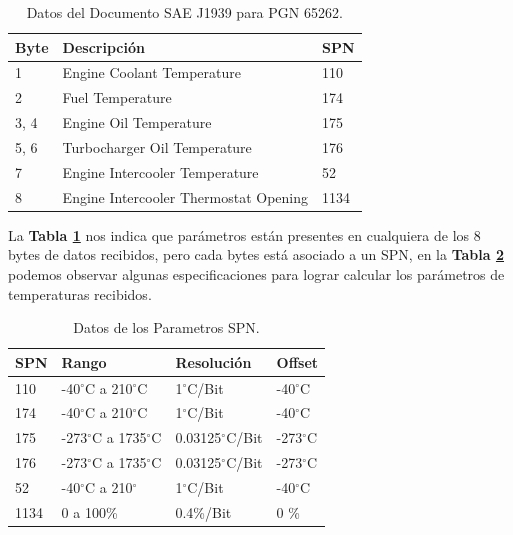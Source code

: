 \begin{table}[htb]
	\begin{center}
		\begin{tabular}{|l|l|l|}
			\hline
			Byte & Descripción & SPN \\
			\hline \hline
			1 & Engine Coolant Temperature   & 110\\ \hline
			2 & Fuel Temperature  & 174\\ \hline
			3, 4 & Engine Oil Temperature   & 175 \\ \hline
			5, 6 & Turbocharger Oil Temperature & 176 \\ \hline
			7    & Engine Intercooler Temperature & 52  \\ \hline
			8    & Engine Intercooler Thermostat Opening & 1134 \\ \hline
		\end{tabular}
		\caption{Datos del Documento SAE J1939 para PGN 65262.}
		\label{tabla5}
	\end{center}
\end{table}

La \textbf{Tabla \ref{tabla5}} nos indica que parámetros están presentes en cualquiera de los 8 bytes de datos recibidos, pero cada bytes está asociado a un SPN, en la \textbf{Tabla \ref{tb_spn}} podemos observar algunas especificaciones para lograr calcular los parámetros de temperaturas recibidos. 

\begin{table}[htb]
	\begin{center}
		\begin{tabular}{|l|l|l|l|} 
			\hline
			SPN & Rango & Resolución & Offset \\
			\hline \hline
			110 &-40$^{\circ}$C a 210$^{\circ}$C & 1$^{\circ}$C/Bit & -40$^{\circ}$C\\ \hline
			174 &-40$^{\circ}$C a 210$^{\circ}$C & 1$^{\circ}$C/Bit & -40$^{\circ}$C\\ \hline
			175 &-273$^{\circ}$C a 1735$^{\circ}$C & 0.03125$^{\circ}$C/Bit & -273$^{\circ}$C\\ \hline
			176 &-273$^{\circ}$C a 1735$^{\circ}$C & 0.03125$^{\circ}$C/Bit & -273$^{\circ}$C\\ \hline
			52    & -40$^{\circ}$C a 210$^{\circ}$ & 1$^{\circ}$C/Bit & -40$^{\circ}$C\\ \hline
			1134   &  0 a 100\%     & 0.4\%/Bit & 0 \% \\ \hline
		\end{tabular}
		\caption{Datos de los Parametros SPN.}
		\label{tb_spn}
	\end{center}
\end{table}

